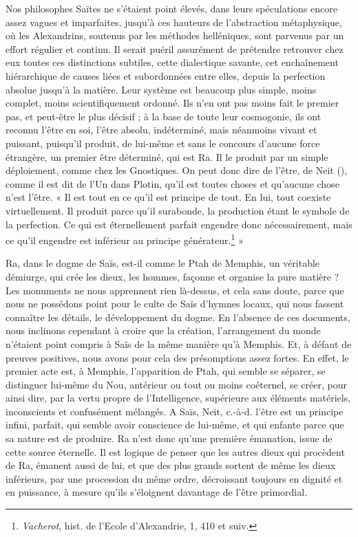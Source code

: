 \documentclass[a4paper, 11pt, oneside]{article}
\newcommand*\hieroAAAQ{}
\begin{document}
Nos philosophes Saïtes ne s'étaient point élevés, dans leurs spéculations encore assez vagues et imparfaites, jusqu'à ces hauteurs de l'abstraction métaphysique, où les Alexandrins, soutenus par les méthodes helléniques, sont parvenus par un effort régulier et continu. Il serait puéril assurément de prétendre retrouver chez eux toutes ces distinctions subtiles, cette dialectique savante, cet enchaînement hiérarchique de causes liées et subordonnées entre elles, depuis la perfection absolue jusqu'à la matière. Leur système est beaucoup plus simple, moins complet, moins scientifiquement ordonné. Ils n'en ont pas moins fait le premier pas, et peut-être le plus décisif ; à la base de toute leur cosmogonie, ils ont reconnu l'être en soi, l'être absolu, indéterminé, mais néanmoins vivant et puissant, puisqu'il produit, de lui-même et sans le concours d'aucune force étrangère, un premier être déterminé, qui est Ra. Il le produit par un simple déploiement, comme chez les Gnostiques. On peut donc dire de l'être, de Neit ($\hieroAAAQ$), comme il est dit de l'Un dans Plotin, qu'il est toutes choses et qu'aucune chose n'est l'être. « Il est tout en ce qu'il est principe de tout. En lui, tout coexiste virtuellement. Il produit parce qu’il surabonde, la production étant le symbole de la perfection. Ce qui est éternellement parfait engendre donc nécessairement, mais ce qu'il engendre est inférieur au principe générateur.\footnote{\emph{Vacherot}, hist. de l'Ecole d'Alexandrie, 1, 410 et suiv.} »

Ra, dans le dogme de Saïs, est-il comme le Ptah de Memphis, un véritable démiurge, qui crée les dieux, les hommes, façonne et organise la pure matière ? Les monuments ne nous apprennent rien là-dessus, et cela sans doute, parce que nous ne possédons point pour le culte de Saïs d'hymnes locaux, qui nous fassent connaître les détails, le développement du dogme. En l'absence de ces documents, nous inclinons cependant à croire que la création, l'arrangement du monde n'étaient point compris à Saïs de la même manière qu'à Memphis. Et, à défaut de preuves positives, nous avons pour cela des présomptions assez fortes. En effet, le premier acte est, à Memphis, l'apparition de Ptah, qui semble se séparer, se distinguer lui-même du Nou, antérieur ou tout ou moins coéternel, se créer, pour ainsi dire, par la vertu propre de l'Intelligence, supérieure aux éléments matériels, inconscients et confusément mélangés. A Saïs, Neit, c.-à-d. l'être est un principe infini, parfait, qui semble avoir conscience de lui-même, et qui enfante parce que sa nature est de produire. Ra n'est donc qu'une première émanation, issue de cette source éternelle. Il est logique de penser que les autres dieux qui procèdent de Ra, émanent aussi de lui, et que des plus grands sortent de même les dieux inférieurs, par une procession du même ordre, décroissant toujours en dignité et en puissance, à mesure qu'ils s'éloignent davantage de l'être primordial.
\end{document}

